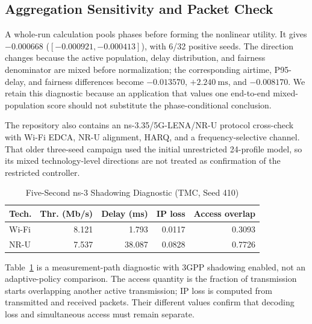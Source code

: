 \subsection{Aggregation Sensitivity and Packet Check}

A whole-run calculation pools phases before forming the nonlinear utility.
It gives $-0.000668$ ($[-0.000921,-0.000413]$), with 6/32 positive seeds.
The direction changes because the active population, delay distribution, and
fairness denominator are mixed before normalization; the corresponding
airtime, P95-delay, and fairness differences become $-0.013570$,
$+\SI{2.240}{\milli\second}$, and $-0.008170$. We retain this diagnostic because
an application that values one end-to-end mixed-population score should not
substitute the phase-conditional conclusion.

The repository also contains an ns-3.35/5G-LENA/NR-U protocol cross-check with
Wi-Fi EDCA, NR-U alignment, HARQ, and a frequency-selective channel. That older
three-seed campaign used the initial unrestricted 24-profile model, so its
mixed technology-level directions are not treated as confirmation of the
restricted controller.

\begin{table}[!t]
\caption{Five-Second ns-3 Shadowing Diagnostic (TMC, Seed 410)}
\label{tab:ns3-diagnostic}
\centering
\scriptsize
\begin{tabular}{@{}lrrrr@{}}
\toprule
Tech. & Thr. (Mb/s) & Delay (ms) & IP loss & Access overlap \\
\midrule
Wi-Fi & 8.121 & 1.793 & 0.0117 & 0.3093 \\
NR-U  & 7.537 & 38.087 & 0.0828 & 0.7726 \\
\bottomrule
\end{tabular}
\end{table}

Table~\ref{tab:ns3-diagnostic} is a measurement-path diagnostic with 3GPP
shadowing enabled, not an adaptive-policy comparison. The access quantity is
the fraction of transmission starts overlapping another active transmission;
IP loss is computed from transmitted and received packets. Their different
values confirm that decoding loss and simultaneous access must remain separate.

